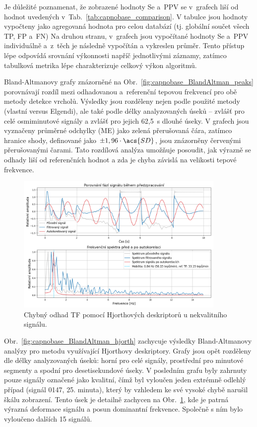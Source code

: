 Je důležité poznamenat, že zobrazené hodnoty \acs{Se} a~\acs{PPV} se v~grafech liší od hodnot uvedených v~Tab.~\ref{tab:capnobase_comparison}.
V tabulce jsou hodnoty vypočteny jako agregovaná hodnota pro celou databází (tj. globální součet všech \acs{TP}, \acs{FP} a~\acs{FN})
Na druhou stranu, v~grafech jsou vypočítané hodnoty \acs{Se} a~\acs{PPV} individuálně a~z~těch je následně vypočítán a vykreslen průměr.
Tento přístup lépe odpovídá srovnání výkonnosti napříč jednotlivými záznamy, zatímco tabulková metrika lépe charakterizuje celkový výkon algoritmů.

Bland-Altmanovy grafy znázorněné na Obr.~\ref{fig:capnobase_BlandAltman_peaks} porovnávají rozdíl mezi odhadovanou a~referenční tepovou frekvencí pro obě metody detekce vrcholů.
Výsledky jsou rozděleny nejen podle použité metody (vlastní versus Elgendi), ale také podle délky analyzovaných úseků -- zvlášť pro celé osmiminutové signály a zvlášť pro jejich 62,5~s dlouhé úseky.
V grafech jsou vyznačeny průměrné odchylky (\acs{ME}) jako zelená přerušovaná čára, zatímco hranice shody, definované jako $\pm1,96 \cdot \acs{SD}$, jsou znázorněny červenými přerušovanými čarami.
Tato rozdílová analýza umožňuje posoudit, jak výrazně se odhady liší od referenčních hodnot a zda je chyba závislá na velikosti tepové frekvence.

\begin{figure}[!bh]
	\centering
	\includegraphics[width=0.9\textwidth]{./obrazky/vysledky/hjorth_preprocess_diffHR.png}
	\caption[Chybný odhad \acs{TF} pomocí Hjorthových deskriptorů u nekvalitního signálu]{Chybný odhad TF pomocí Hjorthových deskriptorů u nekvalitního signálu.}
	\label{fig:capnobase_hjorth_err}
\end{figure}

Obr.~\ref{fig:capnobase_BlandAltman_hjorth} zachycuje výsledky Bland-Altmanovy analýzy pro metodu využívající Hjorthovy deskriptory.
Grafy jsou opět rozděleny dle délky analyzovaných úseků: horní pro celé signály, prostřední pro minutové segmenty a spodní pro desetisekundové úseky.
V posledním grafu byly zahrnuty pouze signály označené jako kvalitní, čímž byl vyloučen jeden extrémně odlehlý případ (signál 0147, 25. minuta), který by vzhledem ke své vysoké chybě narušil škálu zobrazení.
Tento úsek je detailně zachycen na Obr.~\ref{fig:capnobase_hjorth_err}, kde je patrná výrazná deformace signálu a posun dominantní frekvence.
Společně s ním bylo vyloučeno dalších 15 signálů.

